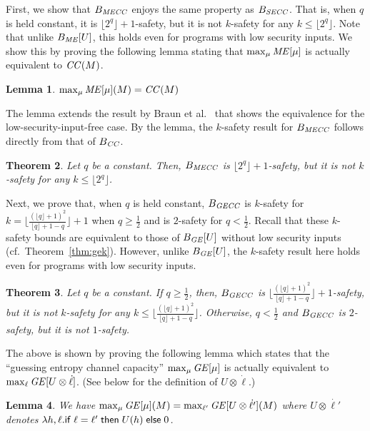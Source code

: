\documentclass{llncs}
\newtheorem{theorem}{Theorem}[section]
\newtheorem{lemma}[theorem]{Lemma}
\begin{document}
First, we show that $B_{\it MECC}$ enjoys the same property as $B_{\it
  SECC}$.  That is, when $q$ is held constant, it is
$\lfloor2^q\rfloor+1$-safety, but it is not $k$-safety for any $k \leq
\lfloor2^q\rfloor$.  Note that unlike $B_{\it ME}[U]$, this holds even
for programs with low security inputs.  We show this by proving the
following lemma stating that $\max_\mu {\it ME}[\mu]$ is actually
equivalent to ${\it CC}(M)$.
\begin{lemma}
\label{lem:mecceqcc}
$\max_\mu {\it ME}[\mu](M)={\it CC}(M)$
\end{lemma}
The lemma extends the result by Braun et al.~\cite{Braun:09:MFPS} that
shows the equivalence for the low-security-input-free case.  By the
lemma, the $k$-safety result for $B_{\it MECC}$ follows directly from
that of $B_{\it CC}$.
\begin{theorem}\label{thm:mecck}
  Let $q$ be a constant.  Then, $B_{\it MECC}$ is
  $\lfloor2^q\rfloor+1$-safety, but it is not $k$-safety for any $k
  \leq \lfloor2^q\rfloor$.
\end{theorem}

Next, we prove that, when $q$ is held constant, $B_{\it GECC}$ is
$k$-safety for $k = \lfloor\frac{(\lfloor q\rfloor +1)^2}{\lfloor
  q\rfloor +1 -q} \rfloor +1$ when $q\geq\frac{1}{2}$ and is
$2$-safety for $q < \frac{1}{2}$.  Recall that these $k$-safety bounds
are equivalent to those of $B_{\it GE}[U]$ without low security inputs
(cf.~Theorem~\ref{thm:gek}).  However, unlike $B_{\it GE}[U]$, the
$k$-safety result here holds even for programs with low security
inputs.
\begin{theorem}\label{thm:gecck}
  Let $q$ be a constant.  If $q\ge\frac{1}{2}$, then, $B_{\it GECC}$
  is $\lfloor\frac{(\lfloor q\rfloor +1)^2}{\lfloor q\rfloor +1 -q}
  \rfloor +1$-safety, but it is not $k$-safety for any $k \leq
  \lfloor\frac{(\lfloor q\rfloor +1)^2}{\lfloor q\rfloor +1 -q}
  \rfloor$.  Otherwise, $q<\frac{1}{2}$ and $B_{\it GECC}$ is
  $2$-safety, but it is not $1$-safety.
\end{theorem}
\begin{sloppypar}
The above is shown by proving the following lemma which states that the
``guessing entropy channel capacity'' $\max_\mu {\it GE}[\mu]$ is
actually equivalent to $\max_\ell {\it GE}[U\otimes\dot{\ell}]$.
(See below for the definition of $U\otimes\dot{\ell}$.)
\end{sloppypar}
\begin{lemma}
\label{lem:gecc}
We have $\max_\mu {\it GE}[\mu](M)=\max_{\ell'} {\it GE}[U\otimes
\dot{\ell'}](M)$ where $U\otimes \dot{\ell'}$ denotes $\lambda
h,\ell.{\sf if}\;\ell=\ell'\;{\sf then}\; U(h)\;{\sf else}\;0$.
\end{lemma}
\end{document}
